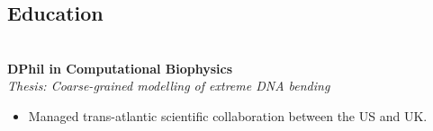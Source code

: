 \documentclass[margin]{res}
\begin{document}
 
\begin{sloppypar}
 
 


\address{2115 Cloville Avenue\\
         Baltimore, MD 21214\\
         +1 443 257 5953
         }
\address{\href{mailto:ryan.harrison@physics.ox.ac.uk}{\nolinkurl{ryan.harrison@physics.ox.ac.uk} } \\
         \href{http://linkedin.com/in/rmharri}{\nolinkurl{linkedin.com/in/rmharri}}\\
         \href{http://verdantforce.com}{\nolinkurl{verdantforce.com}}\\
        }
\address{Wolfson College\\ 
         Oxford OX2 6UD\\
         +44 (0) 7523 229446
         }

\begin{resume} 
\setlength{\parskip}{1.00ex}
\setlength{\parindent}{0pt}
 
\section{Education} 
\\
\textbf{DPhil in Computational Biophysics} \\
\textit{Thesis: Coarse-grained modelling of extreme DNA bending} 
    \begin{itemize}
        \item Managed trans-atlantic scientific collaboration between the US and UK. 
    \end{itemize}


\end{resume}
\end{sloppypar}
\end{document}
